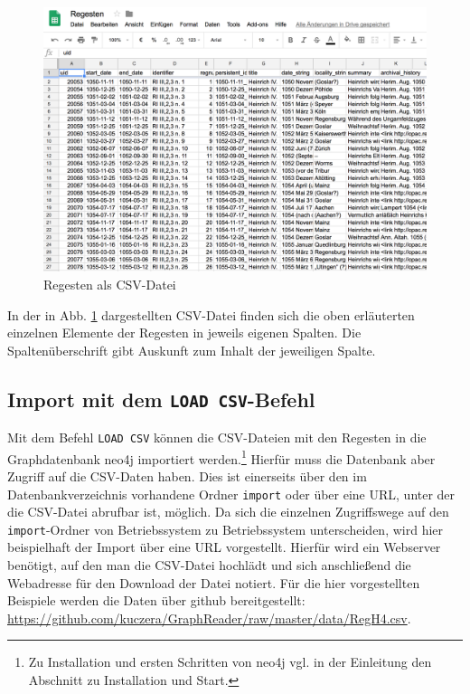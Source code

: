 \documentclass[ngerman,]{scrreprt}
\begin{document}
\begin{figure}
\centering
\includegraphics{Bilder/RI2Graph/ReggH4-Regestentabelle.png}
\caption{Regesten als CSV-Datei}
\label{regestenalscsv}
\end{figure}

In der in Abb. \ref{regestenalscsv} dargestellten CSV-Datei finden sich die oben erläuterten einzelnen Elemente der Regesten in jeweils eigenen Spalten. Die Spaltenüberschrift gibt Auskunft zum Inhalt der jeweiligen Spalte.

\hypertarget{import-mit-dem-load-csv-befehl}{%
\subsection{\texorpdfstring{Import mit dem \texttt{LOAD\ CSV}-Befehl}{Import mit dem LOAD CSV-Befehl}}\label{import-mit-dem-load-csv-befehl}}

Mit dem Befehl \texttt{LOAD\ CSV} können die CSV-Dateien mit den Regesten in die Graphdatenbank neo4j importiert werden.\footnote{Zu Installation und ersten Schritten von neo4j vgl. in der Einleitung den Abschnitt zu Installation und Start.} Hierfür muss die Datenbank aber Zugriff auf die CSV-Daten haben. Dies ist einerseits über den im Datenbankverzeichnis vorhandene Ordner \texttt{import} oder über eine URL, unter der die CSV-Datei abrufbar ist, möglich. Da sich die einzelnen Zugriffswege auf den \texttt{import}-Ordner von Betriebssystem zu Betriebssystem unterscheiden, wird hier beispielhaft der Import über eine URL vorgestellt. Hierfür wird ein Webserver benötigt, auf den man die CSV-Datei hochlädt und sich anschließend die Webadresse für den Download der Datei notiert. Für die hier vorgestellten Beispiele werden die Daten über github bereitgestellt:  \url{https://github.com/kuczera/GraphReader/raw/master/data/RegH4.csv}.
\end{document}
